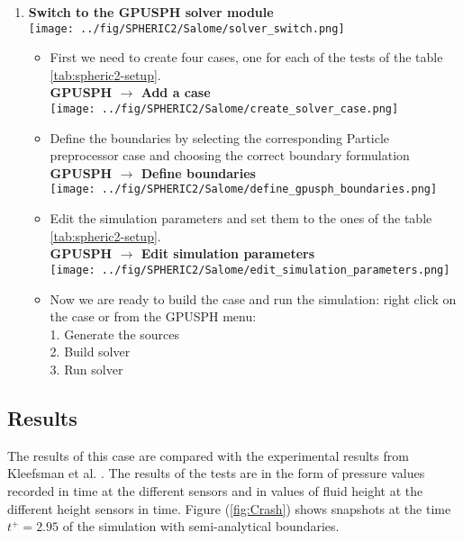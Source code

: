 \documentclass{../GPUSPHtemplate}
\begin{document}
\begin{enumerate}
\item \textbf{Switch to the GPUSPH solver module}  \smallskip\\
  \texttt{[image: ../fig/SPHERIC2/Salome/solver\_switch.png]}
  \begin{itemize}
  \item First we need to create four cases, one for each of the tests of the table \ref{tab:spheric2-setup}.\\
    \textbf{GPUSPH $\to$ Add a case}\smallskip\\
    \texttt{[image: ../fig/SPHERIC2/Salome/create\_solver\_case.png]}
  \item Define the boundaries by selecting the corresponding Particle preprocessor case and choosing the correct boundary formulation\\
    \textbf{GPUSPH $\to$ Define boundaries}\smallskip\\
    \texttt{[image: ../fig/SPHERIC2/Salome/define\_gpusph\_boundaries.png]}
  \item Edit the simulation parameters and set them to the ones of the table \ref{tab:spheric2-setup}.\\
    \textbf{GPUSPH $\to$ Edit simulation parameters}\smallskip\\
    \texttt{[image: ../fig/SPHERIC2/Salome/edit\_simulation\_parameters.png]}\medskip
  \item Now we are ready to build the case and run the simulation: right click on the case or from the GPUSPH menu:\\
    1. Generate the sources\\
    2. Build solver\\
    3. Run solver
  \end{itemize}
\end{enumerate}

\subsection{Results}

The results of this case are compared with the experimental results from Kleefsman et al. \citep{Kleefsman}.
The results of the tests are in the form of pressure values recorded in time at the different sensors
and in values of fluid height at the different height sensors in time.
Figure (\ref{fig:Crash}) shows snapshots at the time $t^+=2.95$ of the simulation with semi-analytical boundaries.
\end{document}
